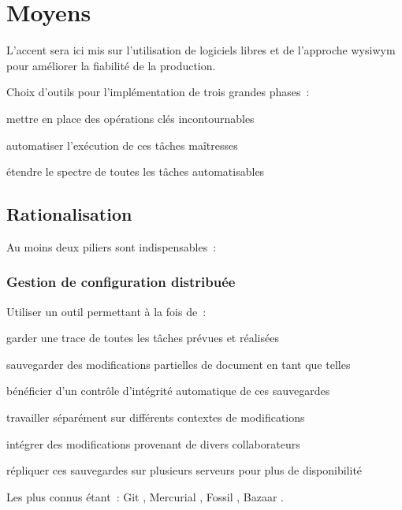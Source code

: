 \section{Moyens}

L’accent sera ici mis sur l’utilisation de logiciels libres
et de l’approche \gls{wysiwym} pour améliorer la fiabilité de la production.

Choix d’outils pour l’implémentation de trois grandes phases :

\begin{itmz}
\item{mettre en place des opérations clés incontournables}
\item{automatiser l’exécution de ces tâches maîtresses}
\item{étendre le spectre de toutes les tâches automatisables}
\end{itmz}

\hr

\subsection{Rationalisation}

Au moins deux piliers sont indispensables :

\subsubsection{Gestion de configuration distribuée}

Utiliser un outil permettant à la fois de :
\begin{itmz}
\item{garder une trace de toutes les tâches prévues et réalisées}
\item{sauvegarder des modifications partielles de document en tant que telles}
\item{bénéficier d’un contrôle d’intégrité automatique de ces sauvegardes}
\item{travailler séparément sur différents contextes de modifications}
\item{intégrer des modifications provenant de divers collaborateurs}
\item{répliquer ces sauvegardes sur plusieurs serveurs pour plus de disponibilité}
\end{itmz}
Les plus connus étant :
Git \cite{git}, Mercurial \cite{hg}, Fossil \cite{fossil}, Bazaar \cite{bazaar}.

